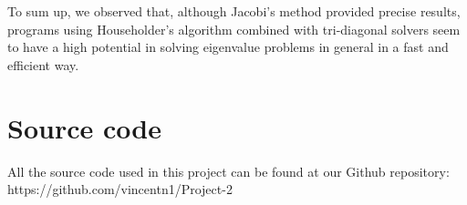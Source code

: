 \documentclass[10pt,a4paper]{article}
\begin{document}
To sum up, we observed that, although Jacobi's method provided precise results, programs using Householder's algorithm combined with tri-diagonal solvers seem to have a high potential in solving eigenvalue problems in general in a fast and efficient way.
\section{Source code}
All the source code used in this project can be found at our Github repository: https://github.com/vincentn1/Project-2
\end{document}
